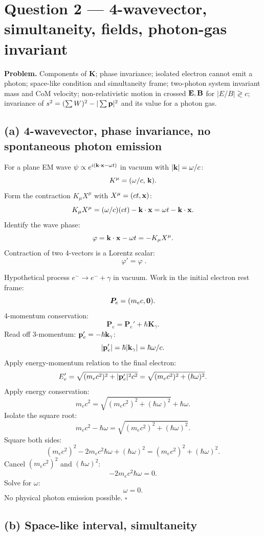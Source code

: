 \documentclass[11pt]{article}
\begin{document}
\section*{Question 2 --- 4-wavevector, simultaneity, fields, photon-gas invariant}

\textbf{Problem.} Components of $\bm K$; phase invariance; isolated electron cannot emit a photon; space-like condition and simultaneity frame; two-photon system invariant mass and CoM velocity; non-relativistic motion in crossed $\vb E,\vb B$ for $|E/B|\gtrless c$; invariance of $s^2=(\sum W)^2-|\sum\vb p|^2$ and its value for a photon gas.

\subsection*{(a) 4-wavevector, phase invariance, no spontaneous photon emission}

For a plane EM wave $\psi\propto e^{i(\vb k\cdot\vb x-\omega t)}$ in vacuum with $|\vb k|=\omega/c$:
\[
K^\mu = (\omega/c,\,\vb k).
\]
Form the contraction $K_\mu X^\mu$ with $X^\mu=(ct,\vb x)$:
\[
K_\mu X^\mu = (\omega/c)(ct) - \vb k\cdot\vb x = \omega t - \vb k\cdot\vb x.
\]
Identify the wave phase:
\[
\varphi = \vb k\cdot\vb x - \omega t = -K_\mu X^\mu.
\]
Contraction of two 4-vectors is a Lorentz scalar:
\[
\boxed{\;\varphi'=\varphi\;}.
\]

Hypothetical process $e^-\to e^- + \gamma$ in vacuum. Work in the initial electron rest frame:
\[
\bm P_e = (m_e c,\vb 0).
\]
4-momentum conservation:
\[
\bm P_e = \bm P_e' + \hbar\bm K_\gamma.
\]
Read off 3-momentum: $\vb p_e' = -\hbar\vb k_\gamma$:
\[
|\vb p_e'| = \hbar|\vb k_\gamma| = \hbar\omega/c.
\]
Apply energy-momentum relation to the final electron:
\[
E_e' = \sqrt{(m_e c^2)^2+|\vb p_e'|^2 c^2} = \sqrt{(m_e c^2)^2+(\hbar\omega)^2}.
\]
Apply energy conservation:
\[
m_e c^2 = \sqrt{(m_e c^2)^2+(\hbar\omega)^2} + \hbar\omega.
\]
Isolate the square root:
\[
m_e c^2 - \hbar\omega = \sqrt{(m_e c^2)^2+(\hbar\omega)^2}.
\]
Square both sides:
\[
(m_e c^2)^2 - 2 m_e c^2\hbar\omega + (\hbar\omega)^2 = (m_e c^2)^2 + (\hbar\omega)^2.
\]
Cancel $(m_e c^2)^2$ and $(\hbar\omega)^2$:
\[
-2 m_e c^2 \hbar\omega = 0.
\]
Solve for $\omega$:
\[
\omega = 0.
\]
No physical photon emission possible. \hfill$\square$

\subsection*{(b) Space-like interval, simultaneity}
\end{document}
